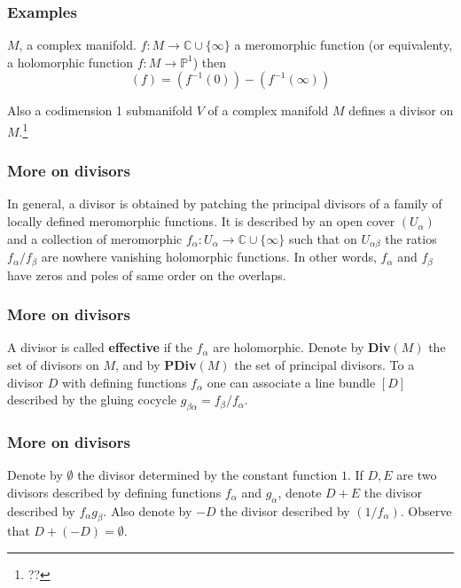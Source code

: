 \documentclass{beamer}
\begin{document}
\begin{frame}
\frametitle{Examples}

$M$, a complex manifold. $f: M \to \mathbb{C} \cup \{\infty\}$ a meromorphic function (or equivalenty, a holomorphic function $f: M \to \mathbb{P}^1$) then \[(f) = (f^{-1}(0)) - (f^{-1}(\infty))\]

Also a codimension 1 submanifold $V$ of a complex manifold $M$ defines a divisor on $M$.\footnote{??}

\end{frame}


\begin{frame}
\frametitle{More on divisors}

In general, a divisor is obtained by patching the principal divisors of a family of locally defined meromorphic functions. \newline It is described by an open cover $(U_\alpha)$ and a collection of meromorphic $f_\alpha : U_\alpha \to \mathbb{C}\cup \{\infty\}$ such that on $U_{\alpha\beta}$ the ratios $f_\alpha/f_\beta$ are nowhere vanishing holomorphic functions. \newline In other words, $f_\alpha$ and $f_\beta$ have zeros and poles of same order on the overlaps.

\end{frame}


\begin{frame}
\frametitle{More on divisors}

A divisor is called \textbf{effective} if the $f_\alpha$ are holomorphic. \newline Denote by \textbf{Div}$(M)$ the set of divisors on $M$, and by \textbf{PDiv}$(M)$ the set of principal divisors. \newline To a divisor $D$ with defining functions $f_\alpha$ one can associate a line bundle $[D]$ described by the gluing cocycle $g_{\beta\alpha} = f_\beta/f_\alpha$.

\end{frame}

\begin{frame}
\frametitle{More on divisors}

Denote by $\emptyset$ the divisor determined by the constant function $1$. \newline If $D,E$ are two divisors described by defining functions $f_\alpha$ and $g_\alpha$, denote $D+E$ the divisor described by $f_\alpha g_\beta$. \newline Also denote by $-D$ the divisor described by $(1/f_\alpha)$. \newline Observe that $D + (-D) = \emptyset$.

\end{frame}
\end{document}
